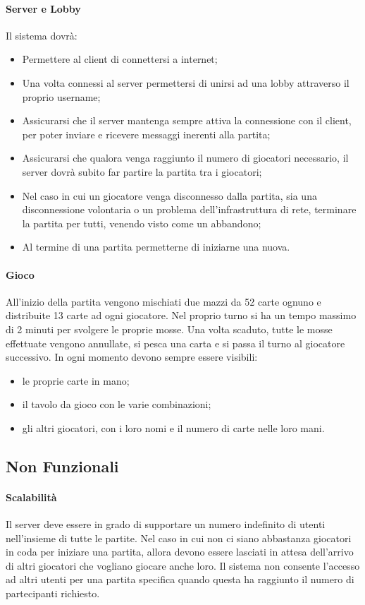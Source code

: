 \paragraph{Server e Lobby}
Il sistema dovrà:
\begin{itemize}
    \item Permettere al client di connettersi a internet;
    \item Una volta connessi al server permettersi di unirsi ad una lobby attraverso il proprio username;
    \item Assicurarsi che il server mantenga sempre attiva la connessione con il client, per poter inviare e ricevere messaggi inerenti alla partita;
    \item Assicurarsi che qualora venga raggiunto il numero di giocatori necessario, il server dovrà subito far partire la partita tra i giocatori;
    \item Nel caso in cui un giocatore venga disconnesso dalla partita, sia una disconnessione volontaria o un problema dell’infrastruttura di rete, terminare la partita per tutti, venendo visto come un abbandono;
    \item Al termine di una partita permetterne di iniziarne una nuova.
\end{itemize}

\paragraph{Gioco}
All’inizio della partita vengono mischiati due mazzi da 52 carte ognuno e distribuite 13 carte ad ogni giocatore.
Nel proprio turno si ha un tempo massimo di 2 minuti per svolgere le proprie mosse.
Una volta scaduto, tutte le mosse effettuate vengono annullate, si pesca una carta e si passa il turno al giocatore successivo.
In ogni momento devono sempre essere visibili:
\begin{itemize}
    \item le proprie carte in mano;
    \item il tavolo da gioco con le varie combinazioni;
    \item gli altri giocatori, con i loro nomi e il numero di carte nelle loro mani.
\end{itemize}

\subsection{Non Funzionali}

\paragraph{Scalabilità}
Il server deve essere in grado di supportare un numero indefinito di utenti nell’insieme di tutte le partite.
Nel caso in cui non ci siano abbastanza giocatori in coda per iniziare una partita, allora devono essere lasciati in attesa dell’arrivo di altri giocatori che vogliano giocare anche loro.
Il sistema non consente l’accesso ad altri utenti per una partita specifica quando questa ha raggiunto il numero di partecipanti richiesto.

